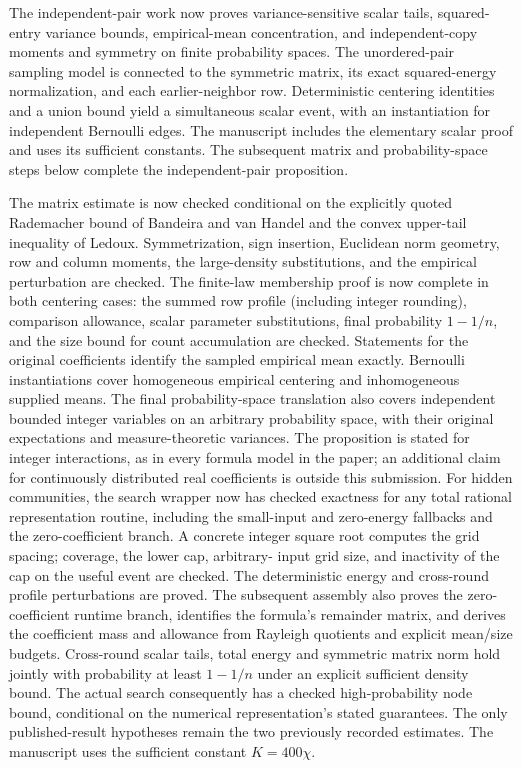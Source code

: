 \documentclass[11pt,a4paper]{article}
\begin{document}
The independent-pair work now proves variance-sensitive scalar tails,
squared-entry variance bounds, empirical-mean concentration, and
independent-copy moments and symmetry on finite probability spaces.
The unordered-pair sampling model is connected to the symmetric matrix,
its exact squared-energy normalization, and each earlier-neighbor row.
Deterministic centering identities and a union bound yield a simultaneous
scalar event, with an instantiation for independent Bernoulli edges.
The manuscript includes the elementary scalar proof and uses its sufficient
constants. The subsequent matrix and probability-space steps below
complete the independent-pair proposition.

The matrix estimate is now checked conditional on the explicitly quoted
Rademacher bound of Bandeira and van Handel and the convex upper-tail
inequality of Ledoux. Symmetrization, sign insertion, Euclidean norm
geometry, row and column moments, the large-density substitutions, and
the empirical perturbation are checked. The finite-law membership proof is now complete in both centering cases:
the summed row profile (including integer rounding), comparison allowance,
scalar parameter substitutions, final probability $1-1/n$, and the size
bound for count accumulation are checked. Statements for the original
coefficients identify the sampled empirical mean exactly. Bernoulli
instantiations cover homogeneous empirical centering and inhomogeneous
supplied means. The final probability-space translation also covers
independent bounded integer variables on an arbitrary probability space,
with their original expectations and measure-theoretic variances. The
proposition is stated for integer interactions, as in every formula model
in the paper; an additional claim for continuously distributed real
coefficients is outside this submission.
For hidden communities, the search wrapper now has checked exactness for
any total rational representation routine, including the small-input and
zero-energy fallbacks and the zero-coefficient branch. A concrete integer
square root computes the grid spacing; coverage, the lower cap, arbitrary-
input grid size, and inactivity of the cap on the useful event are checked.
The deterministic energy and cross-round profile perturbations are proved.
The subsequent assembly also proves the zero-coefficient runtime branch,
identifies the formula's remainder matrix, and derives the coefficient mass
and allowance from Rayleigh quotients and explicit mean/size budgets.
Cross-round scalar tails, total energy and symmetric matrix norm hold jointly
with probability at least $1-1/n$ under an explicit sufficient density bound.
The actual search consequently has a checked high-probability node bound,
conditional on the numerical representation's stated guarantees. The only
published-result hypotheses remain the two previously recorded estimates.
The manuscript uses the sufficient constant $K=400\chi$.
\end{document}
